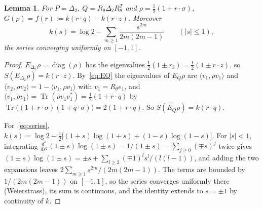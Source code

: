 \documentclass[11pt]{article}
\DeclareMathOperator{\Tr}{Tr}
\DeclareMathOperator{\diag}{diag}
\theoremstyle{plain}
\newtheorem{lemma}[theorem]{Lemma}
\theoremstyle{definition}
\theoremstyle{remark}
\begin{document}
\begin{lemma}\label{lem:bloch}
For $P=\Delta_2$, $Q=R_\theta\Delta_2R_\theta^T$ and $\rho=\frac12(1+r\cdot\sigma)$, $G(\rho)=f(r):=k(r\cdot q)-k(r\cdot z)$. Moreover
\begin{equation}\label{eq:series}
  k(s)=\log2-\sum_{m\ge1}\frac{s^{2m}}{2m(2m-1)}\qquad(|s|\le1),
\end{equation}
the series converging uniformly on $[-1,1]$.
\end{lemma}
\begin{proof}
$E_{\Delta_2}\rho=\diag(\rho)$ has the eigenvalues $\frac12(1\pm r_3)=\frac12(1\pm r\cdot z)$, so $S(E_{\Delta_2}\rho)=k(r\cdot z)$. By~\eqref{eq:EQ}
the eigenvalues of $E_Q\rho$ are $\langle v_1,\rho v_1\rangle$ and $\langle v_2,\rho v_2\rangle=1-\langle v_1,\rho v_1\rangle$ with
$v_1=R_\theta e_1$, and $\langle v_1,\rho v_1\rangle=\Tr(\rho v_1v_1^*)=\frac12(1+r\cdot q)$ by $\Tr\bigl((1+r\cdot\sigma)(1+q\cdot\sigma)\bigr)
=2(1+r\cdot q)$. So $S(E_Q\rho)=k(r\cdot q)$.

For~\eqref{eq:series}, $k(s)=\log2-\frac12\bigl[(1+s)\log(1+s)+(1-s)\log(1-s)\bigr]$. For $|s|<1$, integrating
$\frac{d^2}{ds^2}(1\pm s)\log(1\pm s)=1/(1\pm s)=\sum_{j\ge0}(\mp s)^j$ twice gives $(1\pm s)\log(1\pm s)=\pm s+\sum_{l\ge2}(\mp1)^ls^l/(l(l-1))$,
and adding the two expansions leaves $2\sum_{m\ge1}s^{2m}/(2m(2m-1))$. The terms are bounded by $1/(2m(2m-1))$ on $[-1,1]$, so
the series converges uniformly there (Weierstrass), its sum is continuous, and the identity extends to $s=\pm1$ by
continuity of $k$.
\end{proof}
\end{document}
